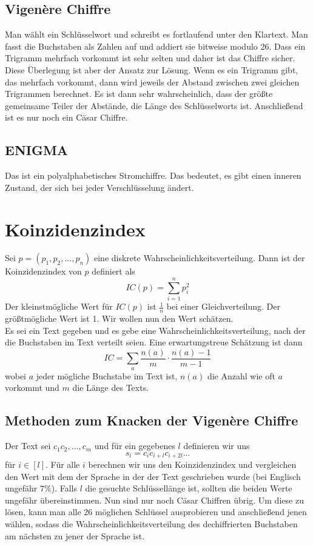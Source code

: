 \documentclass[a4paper, 12pt]{article}
\theoremstyle{plain}
\theoremstyle{definition}
\theoremstyle{lemma}
\theoremstyle{remark}
\theoremstyle{corollary}
\theoremstyle{example}
\begin{document}
	\subsection{Vigenère Chiffre}
	Man wählt ein Schlüsselwort und schreibt es fortlaufend unter den Klartext. Man fasst die Buchstaben als Zahlen auf und addiert sie bitweise modulo 26. Dass ein Trigramm mehrfach vorkommt ist sehr selten und daher ist das Chiffre sicher.\\
	Diese Überlegung ist aber der Ansatz zur Lösung. Wenn es ein Trigramm gibt, das mehrfach vorkommt, dann wird jeweils der Abstand zwischen zwei gleichen Trigrammen berechnet. Es ist dann sehr wahrscheinlich, dass der größte gemeinsame Teiler der Abstände, die Länge des Schlüsselworts ist. Anschließend ist es nur noch ein Cäsar Chiffre.
	\subsection{ENIGMA}
	Das ist ein polyalphabetisches Stromchiffre. Das bedeutet, es gibt einen inneren Zustand, der sich bei jeder Verschlüsselung ändert.
	\section{Koinzidenzindex}
	Sei $p=(p_1,p_2,...,p_n)$ eine diskrete Wahrscheinlichkeitsverteilung. Dann ist der Koinzidenzindex von $p$ definiert als \[IC(p) = \sum_{i=1}^{n}p_i^2\] Der kleinstmögliche Wert für $IC(p)$ ist $\frac{1}{n}$ bei einer Gleichverteilung. Der größtmögliche Wert ist 1. Wir wollen nun den Wert schätzen.\\
	Es sei ein Text gegeben und es gebe eine Wahrscheinlichkeitsverteilung, nach der die Buchstaben im Text verteilt seien. Eine erwartungstreue Schätzung ist dann \[IC = \sum_{a} \frac{n(a)}{m}\cdot \frac{n(a)-1}{m-1}\] wobei $a$ jeder mögliche Buchstabe im Text ist, $n(a)$ die Anzahl wie oft $a$ vorkommt und $m$ die Länge des Texts.
	\subsection{Methoden zum Knacken der Vigenère Chiffre}
	Der Text sei $c_1c_2,...,c_m$ und für ein gegebenes $l$ definieren wir uns \[s_i = c_ic_{i+l}c_{i+2l}...\] für $i \in [l]$. Für alle $i$ berechnen wir uns den Koinzidenzindex und vergleichen den Wert mit dem der Sprache in der der Text geschrieben wurde (bei Englisch ungefähr $7\%$). Falls $l$ die gesuchte Schlüssellänge ist, sollten die beiden Werte ungefähr übereinstimmen.
	Nun sind nur noch Cäsar Chiffren übrig. Um diese zu lösen, kann man alle 26 möglichen Schlüssel ausprobieren und anschließend jenen wählen, sodass die Wahrscheinlichkeitsverteilung des dechiffrierten Buchstaben am nächsten zu jener der Sprache ist.
\end{document}

